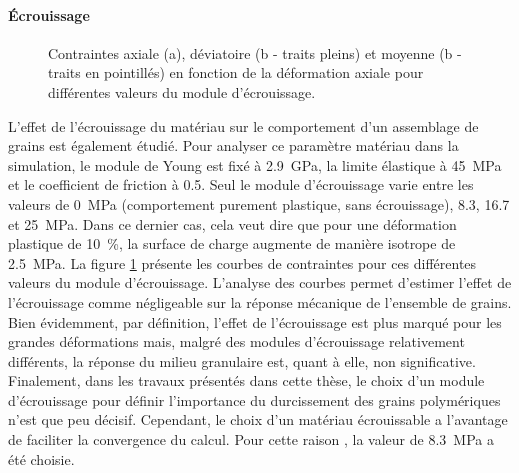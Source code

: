	\paragraph{\'Ecrouissage\\}
		\begin{figure}\centering
			\hfill
			\caption{\label{fig06:material_effect_hardening}Contraintes axiale (a), déviatoire (b - traits pleins) et moyenne (b - traits en pointillés) en fonction de la déformation axiale pour différentes valeurs du module d'écrouissage.}
		\end{figure}
		L'effet de l'écrouissage du matériau sur le comportement d'un assemblage de grains est également étudié. Pour analyser ce paramètre matériau dans la simulation, le module de Young est fixé à \SI{2.9}{\giga\pascal}, la limite élastique à \SI{45}{\mega\pascal} et le coefficient de friction à \num{0.5}. Seul le module d'écrouissage varie entre les valeurs de \SI{0}{\mega\pascal} (comportement purement plastique, sans écrouissage), \num{8.3}, \num{16.7} et \SI{25}{\mega\pascal}. Dans ce dernier cas, cela veut dire que pour une déformation plastique de \SI{10}{\percent}, la surface de charge augmente de manière isotrope de \SI{2.5}{\mega\pascal}. La figure \ref{fig06:material_effect_hardening} présente les courbes de contraintes pour ces différentes valeurs du module d'écrouissage. L'analyse des courbes permet d'estimer l'effet de l'écrouissage comme négligeable sur la réponse mécanique de l'ensemble de grains. Bien évidemment, par définition, l'effet de l'écrouissage est plus marqué pour les grandes déformations mais, malgré des modules d'écrouissage relativement différents, la réponse du milieu granulaire est, quant à elle, non significative. Finalement, dans les travaux présentés dans cette thèse, le choix d'un module d'écrouissage pour définir l'importance du durcissement des grains polymériques n'est que peu décisif. Cependant, le choix d'un matériau écrouissable a l'avantage de faciliter la convergence du calcul. Pour cette raison , la valeur de \SI{8.3}{\mega\pascal} a été choisie.

